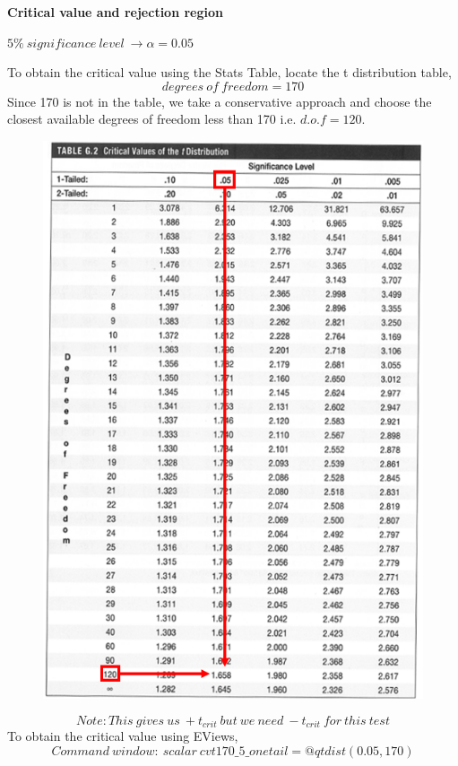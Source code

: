 \documentclass[12pt]{report}
\begin{document}
\noindent \textbf{Critical value and rejection region}

\noindent $5\%\ significance\ level\ \to \alpha = 0.05$

\noindent To obtain the critical value using the Stats Table, locate the t distribution table,
$$degrees\ of\ freedom = 170$$
\noindent Since 170 is not in the table, we take a conservative approach and choose the closest available degrees of freedom less than 170 i.e. $d.o.f=120$. 
\begin{figure}[H]
	\centering
	\includegraphics{q1_24}
\end{figure}
\vspace{-\baselineskip}
$$Note:This\ gives\ us\ +t_{crit}\ but\ we\ need\ -t_{crit}\ for\ this\ test$$
\noindent To obtain the critical value using EViews,
$$Command\ window:\ scalar\ cvt170\_5\_onetail=@qtdist(0.05,170)$$
\end{document}
